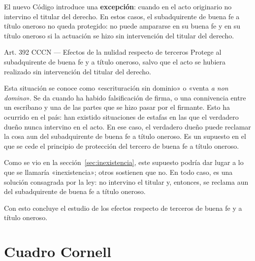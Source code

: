 \documentclass[12pt,oneside]{book}
\begin{document}
El nuevo Código introduce una \textbf{excepción}: cuando en el acto originario no intervino el titular del derecho. En estos casos, el subadquirente de buena fe a título oneroso no queda protegido: no puede ampararse en su buena fe y en su título oneroso si la actuación se hizo sin intervención del titular del derecho.

\begin{articulo}{Art. 392 CCCN --- Efectos de la nulidad respecto de terceros}
Protege al subadquirente de buena fe y a título oneroso, salvo que el acto se hubiera realizado sin intervención del titular del derecho.
\end{articulo}

Esta situación se conoce como «escrituración sin dominio» o «venta \textit{a non domino}». Se da cuando ha habido falsificación de firma, o una connivencia entre un escribano y una de las partes que se hizo pasar por el firmante. Esto ha ocurrido en el país: han existido situaciones de estafas en las que el verdadero dueño nunca intervino en el acto. En ese caso, el verdadero dueño puede reclamar la cosa aun del subadquirente de buena fe a título oneroso. Es un supuesto en el que se cede el principio de protección del tercero de buena fe a título oneroso.

Como se vio en la sección~\ref{sec:inexistencia}, este supuesto podría dar lugar a lo que se llamaría «inexistencia»; otros sostienen que no. En todo caso, es una solución consagrada por la ley: no intervino el titular y, entonces, se reclama aun del subadquirente de buena fe a título oneroso.

Con esto concluye el estudio de los efectos respecto de terceros de buena fe y a título oneroso.

\clearpage
\section{Cuadro Cornell}
\end{document}
